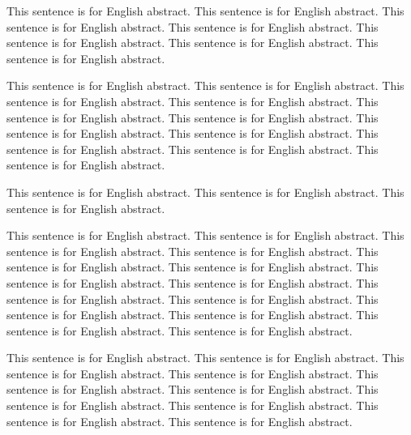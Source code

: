 This sentence is for English abstract.
This sentence is for English abstract.
This sentence is for English abstract.
This sentence is for English abstract.
This sentence is for English abstract.
This sentence is for English abstract.
This sentence is for English abstract.

This sentence is for English abstract.
This sentence is for English abstract.
This sentence is for English abstract.
This sentence is for English abstract.
This sentence is for English abstract.
This sentence is for English abstract.
This sentence is for English abstract.
This sentence is for English abstract.
This sentence is for English abstract.
This sentence is for English abstract.
This sentence is for English abstract.

This sentence is for English abstract.
This sentence is for English abstract.
This sentence is for English abstract.

This sentence is for English abstract.
This sentence is for English abstract.
This sentence is for English abstract.
This sentence is for English abstract.
This sentence is for English abstract.
This sentence is for English abstract.
This sentence is for English abstract.
This sentence is for English abstract.
This sentence is for English abstract.
This sentence is for English abstract.
This sentence is for English abstract.
This sentence is for English abstract.
This sentence is for English abstract.
This sentence is for English abstract.

This sentence is for English abstract.
This sentence is for English abstract.
This sentence is for English abstract.
This sentence is for English abstract.
This sentence is for English abstract.
This sentence is for English abstract.
This sentence is for English abstract.
This sentence is for English abstract.
This sentence is for English abstract.
This sentence is for English abstract.

